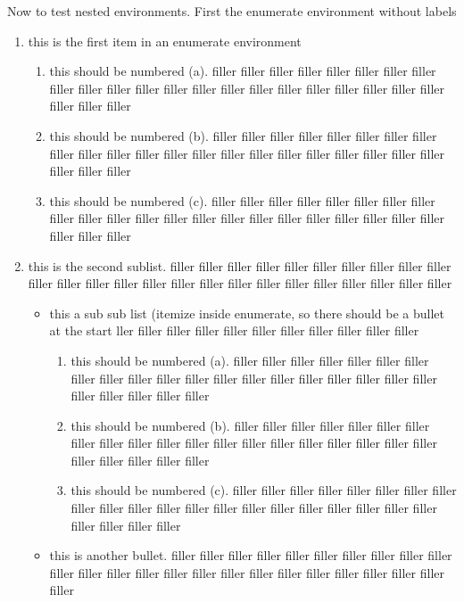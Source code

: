 \documentclass{article}
\begin{document}
Now to test nested environments.  First the enumerate 
environment without labels
\begin{enumerate}
\item this is the first item in an enumerate environment 
   \begin{enumerate}
   \item this should be numbered (a). filler filler filler filler filler filler filler filler filler filler filler filler filler filler filler filler filler filler filler filler filler filler filler filler filler 
   \item this should be numbered (b). filler filler filler filler filler filler filler filler filler filler filler filler filler filler filler filler filler filler filler filler filler filler filler filler filler 
   \item this should be numbered (c). filler filler filler filler filler filler filler filler filler filler filler filler filler filler filler filler filler filler filler filler filler filler filler filler filler 
   \end{enumerate}
\item this is the second sublist. filler filler filler filler filler filler filler filler filler filler filler filler filler filler filler filler filler filler filler filler filler filler filler filler filler 
   \begin{itemize}
   \item this a sub sub list (itemize inside enumerate, so there should be a bullet 
         at the start ller filler filler filler filler filler filler filler filler 
         filler filler 
      \begin{enumerate}
		   \item this should be numbered (a). filler filler filler filler filler filler filler filler filler filler filler filler filler filler filler filler filler filler filler filler filler filler filler filler filler 
		   \item this should be numbered (b). filler filler filler filler filler filler filler filler filler filler filler filler filler filler filler filler filler filler filler filler filler filler filler filler filler 
		   \item this should be numbered (c). filler filler filler filler filler filler filler filler filler filler filler filler filler filler filler filler filler filler filler filler filler filler filler filler filler 
      \end{enumerate}
   \item this is another bullet. filler filler filler filler filler filler filler filler filler filler filler filler filler filler filler filler filler filler filler filler filler filler filler filler filler 

\end{itemize}
\end{enumerate}
\end{document}

